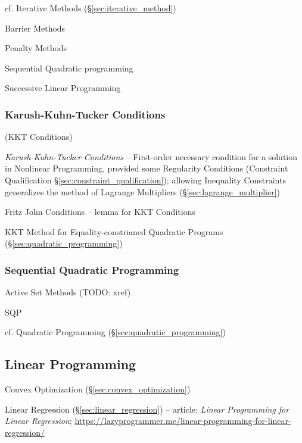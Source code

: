 \fist cf. Iterative Methods (\S\ref{sec:iterative_method})

Barrier Methods

Penalty Methods

Sequential Quadratic programming

Successive Linear Programming



\subsubsection{Karush-Kuhn-Tucker Conditions}\label{sec:karush_kuhn_tucker}

(KKT Conditions)

\emph{Karush-Kuhn-Tucker Conditions} -- First-order necessary condition for a
solution in Nonlinear Programming, provided some Regularity Conditions
(Constraint Qualification \S\ref{sec:constraint_qualification});
allowing Inequality Constraints generalizes the method of Lagrange Multipliers
(\S\ref{sec:lagrange_multiplier})

Fritz John Conditions -- lemma for KKT Conditions

\fist KKT Method for Equality-constrianed Quadratic Programs
(\S\ref{sec:quadratic_programming})



\subsubsection{Sequential Quadratic Programming}
\label{sec:sequential_quadratic_programming}

Active Set Methods (TODO: xref)

SQP

\fist cf. Quadratic Programming (\S\ref{sec:quadratic_programming})



\subsection{Linear Programming}\label{sec:linear_programming}

\fist Convex Optimization (\S\ref{sec:convex_optimization})

\fist Linear Regression (\S\ref{sec:linear_regression}) -- article: \emph{Linear
  Programming for Linear Regression};
\url{https://lazyprogrammer.me/linear-programming-for-linear-regression/}

